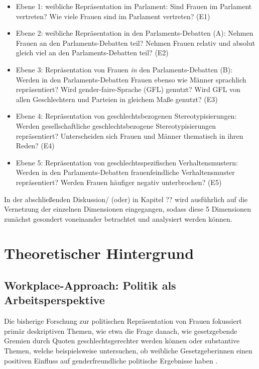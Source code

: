 \documentclass[12pt, 
    twoside=false, 
    bibliography=totoc, 
    numbers=endperiod, 
    headings=normal, 
    toc=chapterentrydotfill
    ]{scrbook}
\begin{document}
\begin{itemize}
    \item Ebene 1: weibliche Repräsentation im Parlament: Sind Frauen im Parlament vertreten? Wie viele Frauen sind im Parlament vertreten? (E1)
    \item Ebene 2: weibliche Repräsentation in den Parlaments-Debatten (A): Nehmen Frauen an den Parlaments-Debatten teil? Nehmen Frauen relativ und absolut gleich viel an den Parlaments-Debatten teil? (E2)
    \item Ebene 3: Repräsentation von Frauen \emph{in} den Parlaments-Debatten (B): Werden in den Parlaments-Debatten Frauen ebenso wie Männer sprachlich repräsentiert? Wird gender-faire-Sprache (GFL) genutzt? Wird GFL von allen Geschlechtern und Parteien in gleichem Maße genutzt? (E3)
    \item Ebene 4: Repräsentation von geschlechtsbezogenen Stereotypisierungen: Werden gesellschaftliche geschlechtsbezogene Stereotypisierungen repräsentiert? Unterscheiden sich Frauen und Männer thematisch in ihren Reden? (E4)
    \item Ebene 5: Repräsentation von geschlechtsspezifischen Verhaltensmustern: Werden in den Parlaments-Debatten frauenfeindliche Verhaltensmuster repräsentiert? Werden Frauen häufiger negativ unterbrochen? (E5)
\end{itemize}

In der abschließenden Diskussion/ (oder) in Kapitel ?? wird ausführlich auf die Vernetzung der einzelnen Dimensionen eingegangen, sodass diese 5 Dimensionen zunächst gesondert voneinander betrachtet und analysiert werden können.


\chapter{Theoretischer Hintergrund}

\section{Workplace-Approach: Politik als Arbeitsperspektive} 

Die bisherige Forschung zur politischen Repräsentation von Frauen fokussiert primär deskriptiven Themen, wie etwa die Frage danach, wie gesetzgebende Gremien durch Quoten geschlechtsgerechter werden können \parencites [vgl.]{dahlerup*_2005}{schwindt-bayer_2009} oder substantive Themen, welche beispielsweise untersuchen, ob weibliche Gesetzgeberinnen einen positiven Einfluss auf genderfreundliche politische Ergebnisse haben \parencites [199]{erikson_2018}{beckwith_2007}.
\end{document}
